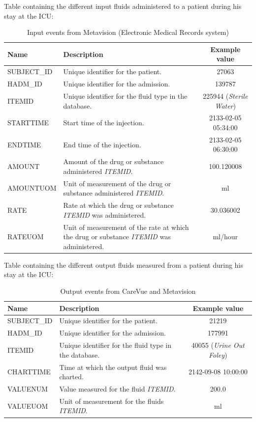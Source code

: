 Table containing the different input fluids administered to a patient during his stay at the ICU:

\begin{table}[H]
 \begin{center}
  \caption{Input events from Metavision (Electronic Medical Records system)}
  \begin{tabular}{| l | p{7cm} | c | }
   \hline
   \textbf{Name} & \textbf{Description} & \textbf{Example value} \\ \hline
   SUBJECT\_ID &  Unique identifier for the patient. & 27063 \\ \hline
   HADM\_ID & Unique identifier for the admission. & 139787 \\ \hline
   ITEMID & Unique identifier for the fluid type in the database. & 225944 (\textit{Sterile Water}) \\ \hline
   STARTTIME & Start time of the injection. & 2133-02-05 05:34:00 \\ \hline
   ENDTIME & End time of the injection. & 2133-02-05 06:30:00 \\ \hline
   AMOUNT & Amount of the drug or substance administered \textit{ITEMID}. & 100.120008 \\ \hline
   AMOUNTUOM & Unit of measurement of the drug or substance administered \textit{ITEMID}. & ml \\ \hline
   RATE & Rate at which the drug or substance \textit{ITEMID} was administered. & 30.036002 \\ \hline
   RATEUOM & Unit of measurement of the rate at which the drug or substance \textit{ITEMID} was administered. & ml/hour \\
   \hline
  \end{tabular}
 \end{center}
\end{table}

\newpage
Table containing the different output fluids measured from a patient during his stay at the ICU:

\begin{table}[H]
 \begin{center}
  \caption{Output events from CareVue and Metavision}
  \begin{tabular}{| l | p{5cm} | c | }
   \hline
   \textbf{Name} & \textbf{Description} & \textbf{Example value} \\ \hline
   SUBJECT\_ID &  Unique identifier for the patient. & 21219 \\ \hline
   HADM\_ID & Unique identifier for the admission. & 177991 \\ \hline
   ITEMID & Unique identifier for the fluid type in the database. & 40055 (\textit{Urine Out Foley}) \\ \hline
   CHARTTIME & Time at which the output fluid was charted. & 2142-09-08 10:00:00 \\ \hline
   VALUENUM & Value measured for the fluid \textit{ITEMID}. & 200.0 \\ \hline
   VALUEUOM & Unit of measurement for the fluids \textit{ITEMID}. & ml \\
   \hline
  \end{tabular}
 \end{center}
\end{table}

